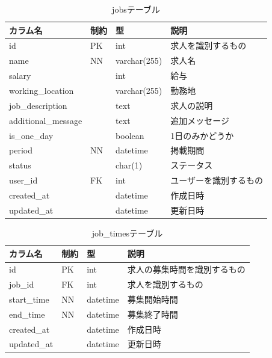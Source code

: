 \begin{table}[H]
  \centering
  \caption{jobsテーブル}
  \label{tab:db-jobs}
  \begin{tabular}{|l|l|l|l|} \hline
    カラム名                & 制約 & 型            & 説明          \\ \hline \hline
    id                  & PK & int          & 求人を識別するもの   \\ \hline
    name                & NN & varchar(255) & 求人名         \\ \hline
    salary              &    & int          & 給与          \\ \hline
    working\_location   &    & varchar(255) & 勤務地         \\ \hline
    job\_description    &    & text         & 求人の説明       \\ \hline
    additional\_message &    & text         & 追加メッセージ     \\ \hline
    is\_one\_day        &    & boolean      & 1日のみかどうか    \\ \hline
    period              & NN & datetime     & 掲載期間        \\ \hline
    status              &    & char(1)      & ステータス       \\ \hline
    user\_id            & FK & int          & ユーザーを識別するもの \\ \hline
    created\_at         &    & datetime     & 作成日時        \\ \hline
    updated\_at         &    & datetime     & 更新日時        \\ \hline
  \end{tabular}
\end{table}

\begin{table}[H]
  \centering
  \caption{job\_timesテーブル}
  \label{tab:db-job-times}
  \begin{tabular}{|l|l|l|l|} \hline
    カラム名        & 制約 & 型        & 説明             \\ \hline \hline
    id          & PK & int      & 求人の募集時間を識別するもの \\ \hline
    job\_id     & FK & int      & 求人を識別するもの      \\ \hline
    start\_time & NN & datetime & 募集開始時間         \\ \hline
    end\_time   & NN & datetime & 募集終了時間         \\ \hline
    created\_at &    & datetime & 作成日時           \\ \hline
    updated\_at &    & datetime & 更新日時           \\ \hline
  \end{tabular}
\end{table}

